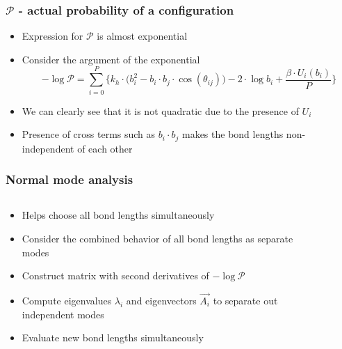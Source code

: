 \documentclass[xcolor=svgnames]{beamer}
\begin{document}
	\begin{frame}
	\frametitle{$\mathcal{P}$ - actual probability of a configuration}
	\begin{itemize}
	\justifying
	\item Expression for $\mathcal{P}$ is almost exponential
	\item Consider the argument of the exponential 
	\begin{equation*}
	- \log \mathcal{P} = \displaystyle\sum\limits_{i=0}^P \Bigg\{ k_h \cdot \Big( b_i^2 - b_i \cdot b_j \cdot \cos (\theta_{ij}) \Big) - 2 \cdot \log b_i + \frac{ \beta \cdot U_i (b_i)}{P} \Bigg\}
	\end{equation*}
	\item We can clearly see that it is not quadratic due to the presence of $U_i$
	\item Presence of cross terms such as $b_i \cdot b_j$ makes the bond lengths non-independent of each other
	\end{itemize}
	\end{frame}
	
	\begin{frame}
	\frametitle{Normal mode analysis}
	\begin{columns}[c]
	\begin{column}{6cm}
	\begin{itemize}
	\justifying
	\item Helps choose all bond lengths simultaneously
	\item Consider the combined behavior of all bond lengths as separate modes
	\item Construct matrix with second derivatives of $- \log \mathcal{P}$
	\item Compute eigenvalues $\lambda_i$ and eigenvectors $\vec{A_i}$ to separate out independent modes
	\item Evaluate new bond lengths simultaneously 
	\end{itemize}
	\end{column}

	\begin{column}{4cm}
	\begin{figure}
	\centering
	\def\svgscale{0.3}
	
	\end{figure}
	\end{column}
	\end{columns}
	\end{frame}
\end{document}

